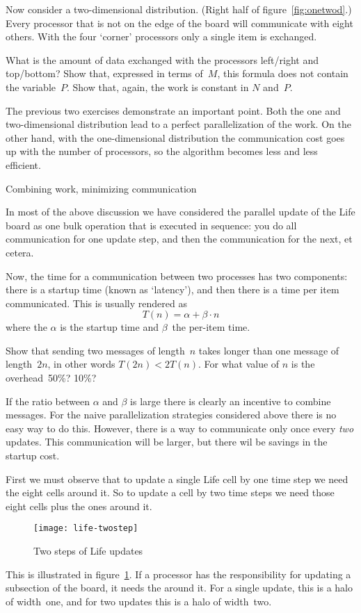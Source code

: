 Now consider a two-dimensional distribution. (Right half of
figure~\ref{fig:onetwod}.)  Every processor that is not on the edge of
the board will communicate with eight others. With the four `corner'
processors only a single item is exchanged.

\begin{exercise}
  What is the amount of data exchanged with the processors left/right
  and top/bottom? Show that, expressed in terms of~$M$, this formula
  does not contain the variable~$P$. Show that, again, the work is
  constant in $N$ and~$P$.
\end{exercise}

The previous two exercises demonstrate an important point. Both the
one and two-dimensional distribution lead to a perfect parallelization
of the work. On the other hand, with the one-dimensional distribution
the communication cost goes up with the number of processors, so the
algorithm becomes less and less efficient.

 {Combining work, minimizing communication}

In most of the above discussion we have considered the parallel update
of the Life board as one bulk operation that is executed in sequence:
you do all communication for one update step, and then the communication
for the next, et cetera.

Now, the time for a communication between two processes has two components:
there is a startup time (known as `latency'), and then there is a time
per item communicated. This is usually rendered as
\[ T(n) = \alpha+\beta\cdot n \]
where the $\alpha$ is the startup time and $\beta$~the per-item time.
 
\begin{exercise}
  Show that sending two messages of length~$n$ takes longer
  than one message of length~$2n$, in other words $T(2n)<2T(n)$.
  For what value of $n$ is the overhead~50\%? 10\%?
\end{exercise}

If the ratio between $\alpha$ and $\beta$ is large there is clearly
an incentive to combine messages. For the naive parallelization
strategies considered above there is no easy way to do this.
However, there is a way to communicate only once every \emph{two} 
updates. This communication will be larger, but there
wil be savings in the startup cost.

First we must observe that to update a single Life cell 
by one time step we need the eight cells around it. So to update
a cell by two time steps we need those eight cells plus the ones around it.
\begin{figure}[ht]
  \texttt{[image: life-twostep]}
  \caption{Two steps of Life updates}
  \label{fig:twostep}
\end{figure}
This is illustrated in figure~\ref{fig:twostep}.
If a processor has the responsibility for updating a subsection of the board,
it needs the 
around it. For a single update, this is a halo of width~one, and
for two updates this is a halo of width~two.

